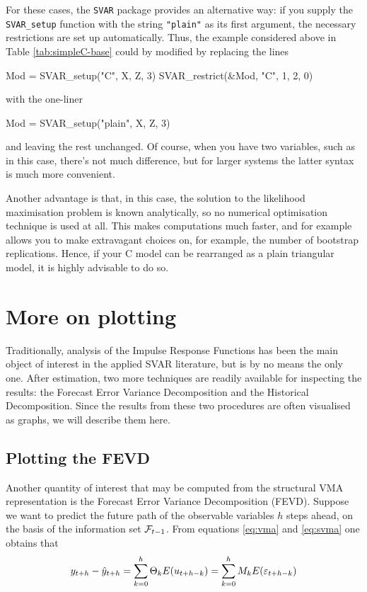 \documentclass[a4paper,10pt]{article}
\newcommand{\PrE}[1]{\ensuremath u_{#1}} %
\newcommand{\StS}[1]{\ensuremath \varepsilon_{#1}} %
\newcommand{\InfSet}[1]{\ensuremath \mathcal{F}_{#1}}
\begin{document}
For these cases, the \texttt{SVAR} package provides an alternative
way: if you supply the \texttt{SVAR\_setup} function with the string
\texttt{"plain"} as its first argument, the necessary restrictions are
set up automatically. Thus, the example considered above in Table
\ref{tab:simpleC-base} could by modified by replacing the lines
\begin{code}
Mod = SVAR_setup("C", X, Z, 3)
SVAR_restrict(&Mod, "C", 1, 2, 0)
\end{code}
with the one-liner
\begin{code}
Mod = SVAR_setup("plain", X, Z, 3)
\end{code}
and leaving the rest unchanged. Of course, when you have two
variables, such as in this case, there's not much difference, but for
larger systems the latter syntax is much more convenient.

Another advantage is that, in this case, the solution to the
likelihood maximisation problem is known analytically, so no numerical
optimisation technique is used at all. This makes computations much
faster, and for example allows you to make extravagant choices on, for
example, the number of bootstrap replications. Hence, if your C model
can be rearranged as a plain triangular model, it is highly advisable
to do so.

\section{More on plotting}
\label{sec:moreplots}

Traditionally, analysis of the Impulse Response Functions has been the
main object of interest in the applied SVAR literature, but is by no
means the only one.  After estimation, two more techniques are readily
available for inspecting the results: the Forecast Error Variance
Decomposition and the Historical Decomposition. Since the results from
these two procedures are often visualised as graphs, we will describe
them here.

\subsection{Plotting the FEVD}
\label{sec:fevdplots}

Another quantity of interest that may be computed from the structural
VMA representation is the Forecast Error Variance Decomposition
(FEVD).  Suppose we want to predict the future path of the observable
variables $h$ steps ahead, on the basis of the information set
$\InfSet{t-1}$. From equations \eqref{eq:vma} and \eqref{eq:svma} one
obtains that
\[
y_{t+h} - \hat{y}_{t+h} = \sum_{k=0}^h \Theta_k E(\PrE{t+h-k}) =
\sum_{k=0}^h M_k E(\StS{t+h-k})
\]
\end{document}
